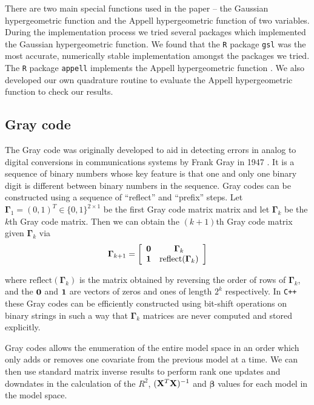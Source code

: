 \documentclass[12pt]{article}
\def\vectorfontone{\bf}
\def\vectorfonttwo{\boldsymbol}
\def\vone{{\vectorfontone 1}}
\def\vzero{{\vectorfontone 0}}
\def\vbeta{{\vectorfonttwo \beta}}               %
\def\matrixfontone{\bf}
\def\matrixfonttwo{\boldsymbol}
\def\mX{{\matrixfontone X}}                      %
\def\mGamma{{\matrixfonttwo \Gamma}}             %
\def\ds{\displaystyle}
\begin{document}
There are two main special functions used in the paper -- the 
Gaussian hypergeometric function and the Appell hypergeometric function
of two variables. During the 
implementation process we tried several packages which implemented the
Gaussian hypergeometric function.
We found that the {\tt R} package {\tt gsl} \citep{Hankin2006} was the most accurate, numerically
stable implementation amongst the packages we tried. The {\tt R} package {\tt appell}
implements the Appell
hypergeometric function \citep{Bove2013}. We also developed our own quadrature routine to evaluate the Appell
hypergeometric function to check our results.


 
\subsection{Gray code} 
\label{sec:GrayCode}


The Gray code was originally developed to aid in detecting errors in analog to digital conversions in
communications systems by Frank Gray in 1947 \cite[][Section 22.3]{PressEtal2007}. It is a sequence of binary numbers whose key feature is that
one and only one binary digit is different between binary numbers in the sequence. 
Gray codes can be constructed using a sequence of ``reflect'' and ``prefix'' steps.
Let $\mGamma_1 = (0,1)^T \in \{0,1\}^{2\times 1}$ be the first Gray code matrix matrix and let $\mGamma_k$ be the $k$th Gray code matrix. Then we can obtain the $(k+1)$th Gray code matrix given $\mGamma_k$ via 
$$
\ds \mGamma_{k+1} = \left[\begin{array}{cc}
\vzero & \mGamma_k \\
\vone  & \mbox{reflect}(\mGamma_k)
\end{array} \right]
$$ 

\noindent where $\mbox{reflect}(\mGamma_k)$ is the matrix obtained by reversing the order of rows of $\mGamma_k$, and the $\vzero$ and $\vone$ are vectors of zeros and ones
of length $2^k$ respectively. In {\tt C++} these Gray codes can be efficiently constructed
using bit-shift operations on binary strings in such a way that $\mGamma_{k}$
matrices are never computed and stored explicitly.

Gray codes allows the enumeration of the entire model space in an order which only adds
or removes one covariate from the previous model at a time. We can then use standard matrix
inverse results to perform rank
one updates and downdates in the calculation of the $R^2$, $(\mX^T\mX)^{-1}$ and
$\widehat{\vbeta}$ values for each model in the
model space.
\end{document}
